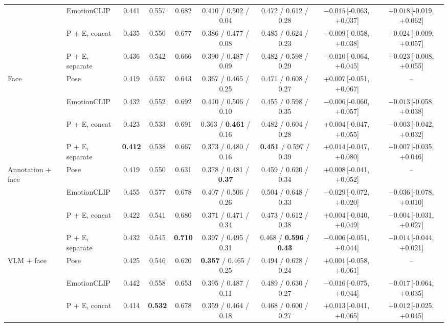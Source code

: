 \documentclass[11pt]{article}
\newcommand{\best}[1]{\textbf{#1}}
\newcommand{\ci}[2]{\,[#1,\,#2]}
\begin{document}
\begin{table}[!htbp]
{\begin{tabular}{llccccccc}
 & EmotionCLIP & 0.441 & 0.557 & 0.682 & 0.410 / 0.502 / 0.04 & 0.472 / 0.612 / 0.28 & $-0.015$\ci{-0.063}{+0.037} & $+0.018$\ci{-0.019}{+0.062} \\
 & P + E, concat & 0.435 & 0.550 & 0.677 & 0.386 / 0.477 / 0.08 & 0.485 / 0.624 / 0.23 & $-0.009$\ci{-0.058}{+0.038} & $+0.024$\ci{-0.009}{+0.057} \\
 & P + E, separate & 0.436 & 0.542 & 0.666 & 0.390 / 0.487 / 0.09 & 0.482 / 0.598 / 0.29 & $-0.010$\ci{-0.064}{+0.045} & $+0.023$\ci{-0.008}{+0.055} \\
\midrule
\multirow{4}{*}{Face} & Pose & 0.419 & 0.537 & 0.643 & 0.367 / 0.465 / 0.25 & 0.471 / 0.608 / 0.27 & $+0.007$\ci{-0.051}{+0.067} & -- \\
 & EmotionCLIP & 0.432 & 0.552 & 0.692 & 0.410 / 0.506 / 0.10 & 0.455 / 0.598 / 0.35 & $-0.006$\ci{-0.060}{+0.057} & $-0.013$\ci{-0.058}{+0.038} \\
 & P + E, concat & 0.423 & 0.533 & 0.691 & 0.363 / \best{0.461} / 0.16 & 0.482 / 0.604 / 0.28 & $+0.004$\ci{-0.047}{+0.055} & $-0.003$\ci{-0.042}{+0.032} \\
 & P + E, separate & \best{0.412} & 0.538 & 0.667 & 0.373 / 0.480 / 0.16 & \best{0.451} / 0.597 / 0.39 & \best{$+0.014$}\ci{-0.047}{+0.080} & $+0.007$\ci{-0.035}{+0.046} \\
\midrule
\multirow{4}{*}{Annotation + face} & Pose & 0.419 & 0.550 & 0.631 & 0.378 / 0.481 / \best{0.37} & 0.459 / 0.620 / 0.34 & $+0.008$\ci{-0.041}{+0.052} & -- \\
 & EmotionCLIP & 0.455 & 0.577 & 0.678 & 0.407 / 0.506 / 0.26 & 0.504 / 0.648 / 0.33 & $-0.029$\ci{-0.072}{+0.020} & $-0.036$\ci{-0.078}{+0.010} \\
 & P + E, concat & 0.422 & 0.541 & 0.680 & 0.371 / 0.471 / 0.34 & 0.473 / 0.612 / 0.38 & $+0.004$\ci{-0.040}{+0.049} & $-0.004$\ci{-0.031}{+0.027} \\
 & P + E, separate & 0.432 & 0.545 & \best{0.710} & 0.397 / 0.495 / 0.31 & 0.468 / \best{0.596} / \best{0.43} & $-0.006$\ci{-0.051}{+0.044} & $-0.014$\ci{-0.044}{+0.021} \\
\midrule
\multirow{4}{*}{VLM + face} & Pose & 0.425 & 0.546 & 0.620 & \best{0.357} / 0.465 / 0.25 & 0.494 / 0.628 / 0.24 & $+0.001$\ci{-0.058}{+0.061} & -- \\
 & EmotionCLIP & 0.442 & 0.558 & 0.653 & 0.395 / 0.487 / 0.11 & 0.489 / 0.630 / 0.27 & $-0.016$\ci{-0.075}{+0.044} & $-0.017$\ci{-0.064}{+0.035} \\
 & P + E, concat & 0.414 & \best{0.532} & 0.678 & 0.359 / 0.464 / 0.18 & 0.468 / 0.600 / 0.27 & $+0.013$\ci{-0.041}{+0.065} & $+0.012$\ci{-0.025}{+0.045} \\

\end{tabular}}
\end{table}
\end{document}
